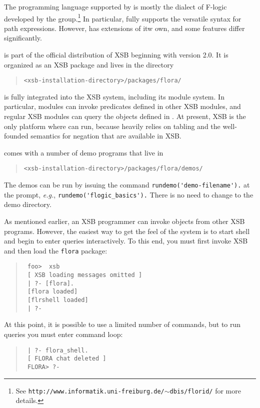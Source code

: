 \documentclass[11pt]{report}
\begin{document}
The programming language supported by \FLORA is mostly the dialect of F-logic
developed by the \FLORID group.\footnote{
  See {\tt http://www.informatik.uni-freiburg.de/$\sim$dbis/florid/} for more
  details.
  }
In particular, \FLORA fully supports the versatile syntax for \FLORID path
expressions. However, \FLORA has extensions of itw own, and some features
differ significantly.

\FLORA is part of the official distribution of XSB beginning with version
2.0. It is organized as an XSB package and lives in the directory
\begin{quote}
 \verb|<xsb-installation-directory>/packages/flora/|  
\end{quote}
\FLORA is fully integrated into the XSB system, including its module
system. In particular, \FLORA modules can invoke predicates defined in
other XSB modules, and regular XSB modules can query the objects defined in
\FLORA. At present, XSB is the only platform where \FLORA can run, because
\FLORA heavily relies on tabling and the well-founded semantics for negation
that are available in XSB.

\FLORA comes with a number of demo programs that live in
\begin{quote}
 \verb|<xsb-installation-directory>/packages/flora/demos/|  
\end{quote}
The demos can be run by issuing the command
\verb|rundemo('demo-filename').| at the \FLORA prompt, {\it e.g.},
\verb|rundemo('flogic_basics').|
There is no need to change to the demo directory.

As mentioned earlier, an XSB programmer can invoke \FLORA objects from
other XSB programs. However, the easiest way to get the feel of the system
is to start \FLORA shell and begin to enter queries interactively.  To
this end, you must first invoke XSB and then load the {\tt flora}
package:
\begin{quote}
  \tt
foo>~~xsb  \\
\tt
[ XSB loading messages omitted ]\\
\tt
| ?- [flora].\\
\tt
[flora loaded]\\
\tt
[flrshell loaded]\\
\tt
| ?-
\end{quote}
At this point, it is possible to use a limited number of \FLORA
commands, but to run queries you must enter \FLORA command loop:
\begin{quote}
  \tt
| ?- flora\_shell.  \\
 \tt
[ FLORA chat deleted ] \\
 \tt
FLORA> ?-
\end{quote}
\end{document}
